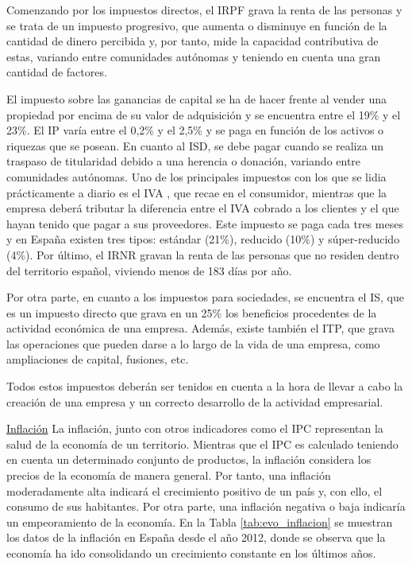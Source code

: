 Comenzando por los impuestos directos, el \acf{IRPF} grava la renta de las personas y se trata de un impuesto progresivo, que aumenta o disminuye en función de la cantidad de dinero percibida y, por tanto, mide la capacidad contributiva de estas, variando entre comunidades autónomas y teniendo en cuenta una gran cantidad de factores.

El impuesto sobre las ganancias de capital se ha de hacer frente al vender una propiedad por encima de su valor de adquisición y se encuentra entre el 19\% y el 23\%. El \acf{IP} varía entre el 0,2\% y el 2,5\% y se paga en función de los activos o riquezas que se posean. En cuanto al \acf{ISD}, se debe pagar cuando se realiza un traspaso de titularidad debido a una herencia o donación, variando entre comunidades autónomas. Uno de los principales impuestos con los que se lidia prácticamente a diario es el \acf{IVA} \cite{impuestosautonomo}, que recae en el consumidor, mientras que la empresa deberá tributar la diferencia entre el \acs{IVA} cobrado a los clientes y el que hayan tenido que pagar a sus proveedores. Este impuesto se paga cada tres meses y en España existen tres tipos: estándar (21\%), reducido (10\%) y súper-reducido (4\%). Por último, el \acf{IRNR} gravan la renta de las personas que no residen dentro del territorio español, viviendo menos de 183 días por año. 

Por otra parte, en cuanto a los impuestos para sociedades, se encuentra el \acf{IS}, que es un impuesto directo que grava en un 25\% los beneficios procedentes de la actividad económica de una empresa. Además, existe también el \acf{ITP}, que grava las operaciones que pueden darse a lo largo de la vida de una empresa, como ampliaciones de capital, fusiones, etc.

Todos estos impuestos deberán ser tenidos en cuenta a la hora de llevar a cabo la creación de una empresa y un correcto desarrollo de la actividad empresarial.

\noindent\underline{Inflación}\newline
\indent La inflación, junto con otros indicadores como el \acf{IPC} representan la salud de la economía de un territorio. Mientras que el \acs{IPC} es calculado teniendo en cuenta un determinado conjunto de productos, la inflación considera los precios de la economía de manera general. Por tanto, una inflación moderadamente alta indicará el crecimiento positivo de un país y, con ello, el consumo de sus habitantes. Por otra parte, una inflación negativa o baja indicaría un empeoramiento de la economía. En la Tabla \ref{tab:evo_inflacion} se muestran los datos de la inflación en España desde el año 2012, donde se observa que la economía ha ido consolidando un crecimiento constante en los últimos años.

